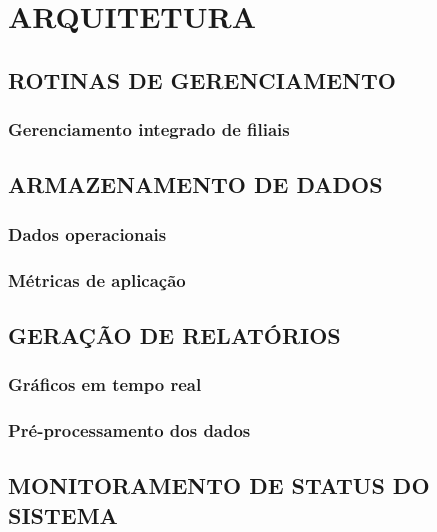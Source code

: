 \chapter{ARQUITETURA}

\section{ROTINAS DE GERENCIAMENTO}

\subsection{Gerenciamento integrado de filiais}

\section{ARMAZENAMENTO DE DADOS}

\subsection{Dados operacionais}

\subsection{Métricas de aplicação}

\section{GERAÇÃO DE RELATÓRIOS}

\subsection{Gráficos em tempo real}

\subsection{Pré-processamento dos dados}

\section{MONITORAMENTO DE STATUS DO SISTEMA}
